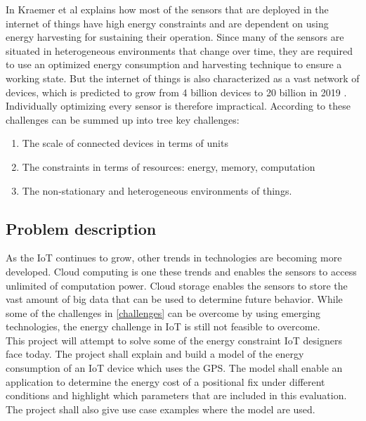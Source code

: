In \cite{kraemer} Kraemer et al explains how most of the sensors that are deployed in the internet of things have high energy constraints and are dependent on using energy harvesting for sustaining their operation. Since many of the sensors are situated in heterogeneous environments that change over time, they are required to use an optimized energy consumption and harvesting technique to ensure a working state. But the internet of things is also characterized as a vast network of devices, which is predicted to grow from 4 billion devices to 20 billion in 2019 \cite{IEA}. Individually optimizing every sensor is therefore impractical. According to \cite{frank} these challenges can be summed up into tree key challenges: 
\begin{enumerate}
    \item The scale of connected devices in terms of units
    \item The constraints in terms of resources: energy, memory, computation
    \item The non-stationary and heterogeneous environments of things.
    \label{challenges}
    
\end{enumerate}

\subsection{Problem description}

As the  IoT continues to grow, other trends in technologies are becoming more developed. Cloud computing is one these trends \cite{Cloud} and enables the sensors to access unlimited of computation power. Cloud storage enables the sensors to store the vast amount of big data that can be used to determine future behavior. While some of the challenges in \ref{challenges} can be overcome by using emerging technologies, the energy challenge in IoT is still not feasible to overcome. \\This project will attempt to solve some of the energy constraint IoT designers face today. The project shall explain and build a model of the energy consumption of an IoT device which uses the GPS. The model shall enable an application to determine the energy cost of a positional fix under different conditions and highlight which parameters that are included in this evaluation. The project shall also give use case examples where the model are used.\\





